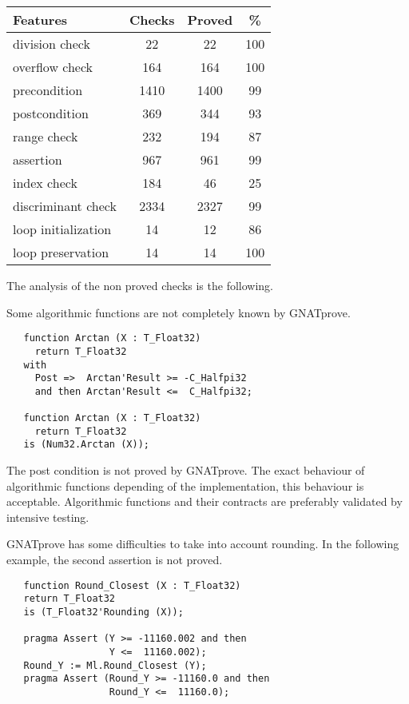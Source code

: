 \documentclass[10pt,a4paper,twocolumn]{article}
\newcommand{\gnatprove}{GNATprove\xspace}
\begin{document}
\begin{tabular}{|l|c|c|c|}
\hline
Features            & Checks & Proved & \%  \\
\hline
division check      & 22     & 22     & 100 \\
\hline
overflow check      & 164    & 164    & 100 \\
\hline
precondition        & 1410   & 1400   & 99  \\
\hline
postcondition       & 369    & 344    & 93  \\
\hline
range check         & 232    & 194    & 87  \\
\hline
assertion           & 967    & 961    & 99  \\
\hline
index check         & 184    & 46     & 25  \\
\hline
discriminant check  & 2334   & 2327   & 99  \\
\hline
loop initialization & 14     & 12     & 86  \\
\hline
loop  preservation  & 14     & 14     & 100 \\
\hline
\end{tabular}

\vspace{5mm}

The analysis of the non proved checks is the following.

\vspace{5mm}

Some algorithmic functions are not completely known by \gnatprove.

\begin{lstlisting}
   function Arctan (X : T_Float32)
	 return T_Float32
   with
     Post =>  Arctan'Result >= -C_Halfpi32
     and then Arctan'Result <=  C_Halfpi32;

   function Arctan (X : T_Float32)
	 return T_Float32
   is (Num32.Arctan (X));
\end{lstlisting}

The post condition is not proved by \gnatprove.
The exact behaviour of algorithmic functions depending of the implementation, this behaviour is acceptable.
Algorithmic functions and their contracts are preferably validated by intensive testing.

\vspace{5mm}

\gnatprove has some difficulties to take into account rounding.
In the following example, the second assertion is not proved.

\begin{lstlisting}
   function Round_Closest (X : T_Float32)
   return T_Float32
   is (T_Float32'Rounding (X));

   pragma Assert (Y >= -11160.002 and then
                  Y <=  11160.002);
   Round_Y := Ml.Round_Closest (Y);
   pragma Assert (Round_Y >= -11160.0 and then
                  Round_Y <=  11160.0);
\end{lstlisting}
\end{document}
